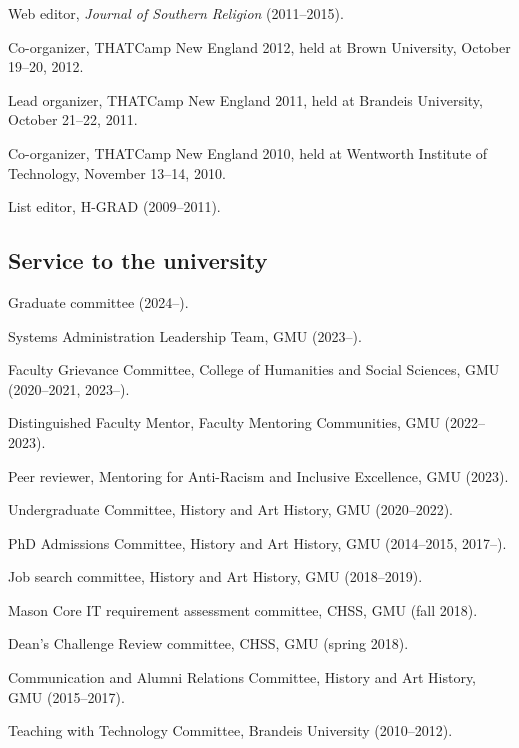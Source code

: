 \documentclass[11pt]{article}
\begin{document}
Web editor, \emph{Journal of Southern Religion} (2011--2015).

Co-organizer, THATCamp New England 2012, held at Brown University, October 19--20, 2012.

Lead organizer, THATCamp New England 2011, held at Brandeis University, October 21--22, 2011.

Co-organizer, THATCamp New England 2010, held at Wentworth Institute of Technology, November 13--14, 2010.

List editor, H-GRAD (2009--2011).

\subsection{Service to the university}\label{Service to the university}

Graduate committee (2024--).

Systems Administration Leadership Team, GMU (2023--).

Faculty Grievance Committee, College of Humanities and Social Sciences, GMU 
(2020--2021, 2023--).

Distinguished Faculty Mentor, Faculty Mentoring Communities, GMU (2022--2023).

Peer reviewer, Mentoring for Anti-Racism and Inclusive Excellence, GMU (2023).

Undergraduate Committee, History and Art History, GMU (2020--2022).

PhD Admissions Committee, History and Art History, GMU (2014--2015, 2017--).

Job search committee, History and Art History, GMU (2018--2019).

Mason Core IT requirement assessment committee, CHSS, GMU (fall 2018).

Dean's Challenge Review committee, CHSS, GMU (spring 2018).

Communication and Alumni Relations Committee, History and Art History, GMU 
(2015--2017).

Teaching with Technology Committee, Brandeis University (2010--2012).


\end{document}
